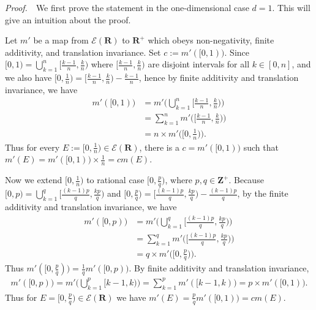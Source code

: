 \documentclass{book}
\theoremstyle{defstyle}
\theoremstyle{thmstyle}
\newcommand{\pff}{\noindent\emph{Proof.}~~}
\begin{document}
\pff We first prove the statement in the one-dimensional case $d = 1$. This will give an intuition about the proof.

Let $m'$ be a map from $\mathcal{E}(\mathbf{R})$ to $\mathbf{R}^+$ which obeys non-negativity, finite additivity, and translation invariance. Set $c := m'([0, 1))$. Since $[0, 1) = \bigcup_{k = 1}^{n}[\frac{k - 1}{n}, \frac{k}{n})$ where $[\frac{k - 1}{n}, \frac{k}{n})$ are disjoint intervals for all $k \in [0, n]$, and we also have $[0, \frac{1}{n}) = [\frac{k - 1}{n}, \frac{k}{n}) - \frac{k - 1}{n}$, hence by finite additivity and translation invariance, we have
    \begin{align*}
        m'([0, 1))
        &= m'\Big(\bigcup_{k = 1}^{n}\Big[\frac{k - 1}{n}, \frac{k}{n}\Big)\Big)\\
        &= \sum_{k = 1}^{n}m'\Big(\Big[\frac{k - 1}{n}, \frac{k}{n}\Big)\Big)\\
        &= n \times m'\Big(\Big[0, \frac{1}{n}\Big)\Big).
    \end{align*}
Thus for every $E := [0, \frac{1}{n}) \in \mathcal{E}(\mathbf{R})$, there is a $c = m'([0, 1))$ such that $m'(E) = m'([0, 1)) \times \frac{1}{n} = cm(E)$.

Now we extend $[0, \frac{1}{n})$ to rational case $[0, \frac{p}{q})$, where $p, q \in \mathbf{Z}^+$. Because $[0, p) = \bigcup_{k = 1}^{q} [\frac{(k - 1)p}{q}, \frac{kp}{q})$ and $[0, \frac{p}{q}) = [\frac{(k - 1)p}{q}, \frac{kp}{q}) - \frac{(k - 1)p}{q}$, by the finite additivity and translation invariance, we have
    \begin{align*}
        m'([0, p))
        &= m'\Big(\bigcup_{k = 1}^{q} \Big[\frac{(k - 1)p}{q}, \frac{kp}{q}\Big)\Big)\\
        &= \sum_{k = 1}^{q} m'\Big(\Big[\frac{(k - 1)p}{q}, \frac{kp}{q}\Big)\Big)\\
        &= q \times m'\Big(\Big[0, \frac{p}{q}\Big)\Big).
    \end{align*}
Thus $m'([0, \frac{p}{q})) = \frac{1}{q}m'([0, p))$. By finite additivity and translation invariance,
    \begin{align*}
        m'([0, p))
        = m'\Big(\bigcup_{k = 1}^{p}[k - 1, k)\Big)
        = \sum_{k = 1}^{p}m'([k - 1, k))
        = p \times m'([0, 1)).
    \end{align*}
Thus for $E = [0, \frac{p}{q}) \in \mathcal{E}(\mathbf{R})$ we have $m'(E) = \frac{p}{q}m'([0, 1)) = cm(E)$.
\end{document}
